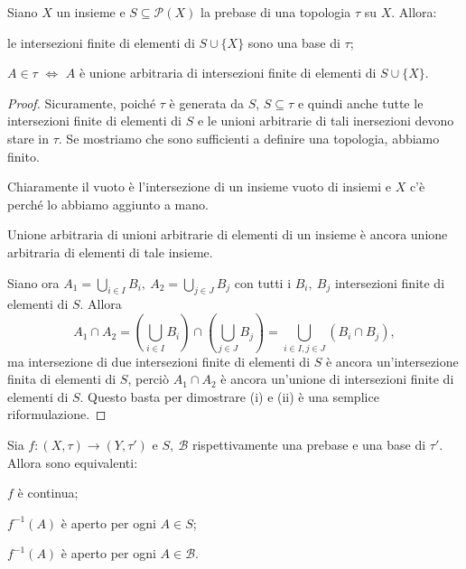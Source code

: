 \documentclass{article}
\begin{document}
\begin{prop}
	Siano $X$ un insieme e $S \subseteq \mathcal{P}(X)$ la prebase di una
	topologia $\tau$ su $X$. Allora:
	\begin{nlist}
		\item le intersezioni finite di elementi di $S \cup \{X\}$ sono una base
		di $\tau$;
		\item $A \in \tau$ $\Leftrightarrow$ $A$ è unione arbitraria di
		intersezioni finite di elementi di $S \cup \{X\}$.
	\end{nlist}
\end{prop}

\begin{proof}
	Sicuramente, poiché $\tau$ è generata da $S$, $S \subseteq \tau$ e quindi
	anche tutte le intersezioni finite di elementi di $S$ e le unioni arbitrarie
	di tali inersezioni devono stare in $\tau$. Se mostriamo che sono
	sufficienti a definire una topologia, abbiamo finito.

    Chiaramente il vuoto è l'intersezione di un insieme vuoto di insiemi e $X$
    c'è perché lo abbiamo aggiunto a mano.

    Unione arbitraria di unioni arbitrarie di elementi di un insieme è ancora
    unione arbitraria di elementi di tale insieme.

    Siano ora $\displaystyle A_1= \bigcup_{i \in I} B_i,\ A_2=\bigcup_{j \in J} B_j$ con tutti
    i $B_i,\ B_j$ intersezioni finite di elementi di $S$. Allora
    $$A_1 \cap A_2 =
    \left( \bigcup_{i \in I} B_i \right) \cap \left(\bigcup_{j \in J} B_j
    \right)= \bigcup_{i \in I, j \in J} (B_i \cap B_j),$$
     ma  intersezione di due intersezioni finite di elementi di $S$ è ancora
     un'intersezione finita di elementi di $S$, perciò $A_1 \cap A_2$ è ancora
     un'unione di intersezioni finite di elementi di $S$. Questo basta per
     dimostrare (i) e (ii) è una semplice riformulazione.
\end{proof}

\begin{prop}
	Sia $f: (X, \tau) \rightarrow (Y, \tau')$ e $S,\ \mathcal{B}$
	rispettivamente una prebase e una base di $\tau'$. Allora sono equivalenti:
	\begin{nlist}
		\item $f$ è continua;
		\item $f^{-1}(A)$ è aperto per ogni $A \in S$;
		\item $f^{-1}(A)$ è aperto per ogni $A \in \mathcal{B}$.
	\end{nlist}
\end{prop}
\end{document}

